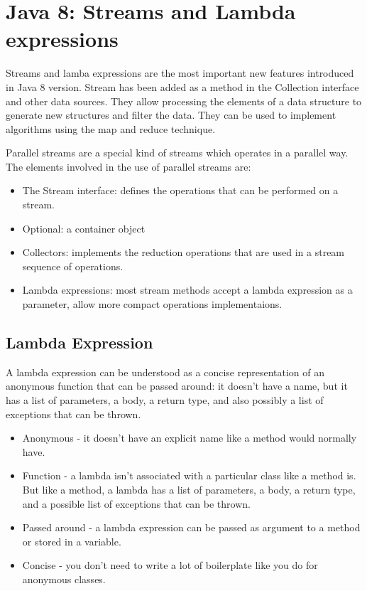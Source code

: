 
\chapter{Java 8: Streams and Lambda expressions} %

\label{Chapter2} %

Streams and lamba expressions are the most important new features introduced in Java 8 version. Stream has been added as a method in the Collection interface and other data sources. They allow processing the elements of a data structure to generate new structures and filter the data. They can be used to implement algorithms using the map and reduce technique.

Parallel streams are a special kind of streams which operates in a parallel way. The elements involved in the use of parallel streams are:
\begin{itemize}
\item The Stream interface: defines the operations that can be performed on a stream.
\item Optional: a container object
\item Collectors: implements the reduction operations that are used in a stream sequence of operations.
\item Lambda expressions: most stream methods accept a lambda expression as a parameter, allow more compact operations implementaions.
\end{itemize}

\section{Lambda Expression}

A lambda expression can be understood as a concise representation of an anonymous function that can be passed around: it doesn’t have a name, but it has a list of parameters, a body, a return type, and also possibly a list of exceptions that can be thrown.

\begin{itemize}
\item Anonymous - it doesn’t have an explicit name like a method would normally have.
\item Function - a lambda isn’t associated with a particular class like a method is. But like a method, a lambda has a list of parameters, a body, a return type, and a possible list of exceptions that can be thrown.
\item Passed around - a lambda expression can be passed as argument to a method or stored in a variable.
\item Concise - you don’t need to write a lot of boilerplate like you do for anonymous classes.
\end{itemize}

